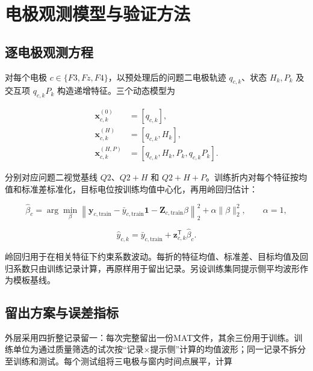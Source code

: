 \documentclass[UTF8,12pt,a4paper,fontset=windows]{ctexart}
\begin{document}
\hypertarget{ux7535ux6781ux89c2ux6d4bux6a21ux578bux4e0eux9a8cux8bc1ux65b9ux6cd5}{%
\section{电极观测模型与验证方法}\label{ux7535ux6781ux89c2ux6d4bux6a21ux578bux4e0eux9a8cux8bc1ux65b9ux6cd5}}

\hypertarget{ux9010ux7535ux6781ux89c2ux6d4bux65b9ux7a0b}{%
\subsection{逐电极观测方程}\label{ux9010ux7535ux6781ux89c2ux6d4bux65b9ux7a0b}}

对每个电极 \(c\in\{F3,Fz,F4\}\)，以预处理后的问题二电极轨迹 \(q_{c,k}\)、状态 \(H_k,P_k\) 及交互项 \(q_{c,k}P_k\) 构造递增特征。三个动态模型为

\[
\begin{aligned}
\mathbf x_{c,k}^{(0)}&=[q_{c,k}],\\
\mathbf x_{c,k}^{(H)}&=[q_{c,k},H_k],\\
\mathbf x_{c,k}^{(H,P)}&=[q_{c,k},H_k,P_k,q_{c,k}P_k].
\end{aligned}
\]

分别对应问题二视觉基线 \(Q2\)、\(Q2+H\) 和 \(Q2+H+P\)。训练折内对每个特征按均值和标准差标准化，目标电位按训练均值中心化，再用岭回归估计：

\[
\hat\beta_c=\arg\min_{\beta}
\left\|\mathbf y_{c,\mathrm{train}}-\bar y_{c,\mathrm{train}}\mathbf 1-
\mathbf Z_{c,\mathrm{train}}\beta\right\|_2^2+
\alpha\|\beta\|_2^2,\qquad \alpha=1,
\]

\[
\hat y_{c,k}=\bar y_{c,\mathrm{train}}+
\mathbf z_{c,k}^{\mathsf T}\hat\beta_c.
\]

岭回归用于在相关特征下约束系数波动\cite{hoerlKennard}。每折的特征均值、标准差、目标均值及回归系数只由训练记录计算，再原样用于留出记录。另设训练集同提示侧平均波形作为模板基线。

\hypertarget{ux7559ux51faux65b9ux6848ux4e0eux8befux5deeux6307ux6807}{%
\subsection{留出方案与误差指标}\label{ux7559ux51faux65b9ux6848ux4e0eux8befux5deeux6307ux6807}}

外层采用四折整记录留一：每次完整留出一份MAT文件，其余三份用于训练。训练单位为通过质量筛选的试次按``记录×提示侧''计算的均值波形；同一记录不拆分至训练和测试。每个测试组将三电极与窗内时间点展平，计算
\end{document}
